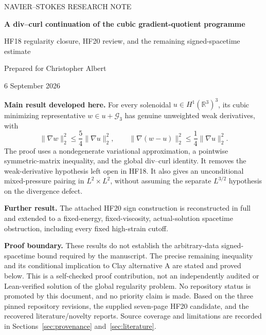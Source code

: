 \documentclass[11pt,a4paper]{article}
\theoremstyle{definition}
\newcommand{\R}{\mathbb R}
\newcommand{\G}{\mathcal G_3}
\begin{document}
\begin{titlepage}
\thispagestyle{empty}
\vspace*{12mm}
{\large NAVIER--STOKES RESEARCH NOTE\par}
\vspace{12mm}
{\Huge\bfseries A div--curl continuation of the cubic gradient-quotient programme\par}
\vspace{8mm}
{\Large HF18 regularity closure, HF20 review, and the remaining signed-spacetime estimate\par}
\vspace{9mm}
{\large Prepared for Christopher Albert\par}
{\large 6 September 2026\par}
\vspace{12mm}
\noindent\textbf{Main result developed here.} For every solenoidal $u\in H^1(\R^3)^3$, its cubic minimizing representative $w\in u+\G$ has genuine unweighted weak derivatives, with
\[
 \boxed{\ \|\nabla w\|_2^2\le\frac54\|\nabla u\|_2^2,\qquad
 \|\nabla(w-u)\|_2^2\le\frac14\|\nabla u\|_2^2.\ }
\]
The proof uses a nondegenerate variational approximation, a pointwise symmetric-matrix inequality, and the global div--curl identity. It removes the weak-derivative hypothesis left open in HF18. It also gives an unconditional mixed-pressure pairing in $L^2\times L^2$, without assuming the separate $L^{3/2}$ hypothesis on the divergence defect.

\vspace{5mm}
\noindent\textbf{Further result.} The attached HF20 sign construction is reconstructed in full and extended to a fixed-energy, fixed-viscosity, actual-solution spacetime obstruction, including every fixed high-strain cutoff.

\vspace{5mm}
\noindent\textbf{Proof boundary.} These results do not establish the arbitrary-data signed-spacetime bound required by the manuscript. The precise remaining inequality and its conditional implication to Clay alternative A are stated and proved below. This is a self-checked proof contribution, not an independently audited or Lean-verified solution of the global regularity problem. No repository status is promoted by this document, and no priority claim is made.
\vfill
{\small Based on the three pinned repository revisions, the supplied seven-page HF20 candidate, and the recovered literature/novelty reports. Source coverage and limitations are recorded in Sections~\ref{sec:provenance} and~\ref{sec:literature}.}
\end{titlepage}
\end{document}
